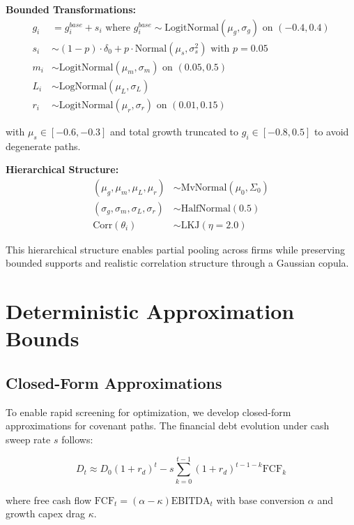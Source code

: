 \documentclass[11pt,a4paper]{article}
\begin{document}
\textbf{Bounded Transformations:}
\begin{align}
g_i &= g^{base}_i + s_i \text{ where } g^{base}_i \sim \text{LogitNormal}(\mu_g, \sigma_g) \text{ on } (-0.4, 0.4) \\
s_i &\sim (1-p) \cdot \delta_0 + p \cdot \text{Normal}(\mu_s, \sigma_s^2) \text{ with } p = 0.05 \\
m_i &\sim \text{LogitNormal}(\mu_m, \sigma_m) \text{ on } (0.05, 0.5) \\
L_i &\sim \text{LogNormal}(\mu_L, \sigma_L) \\
r_i &\sim \text{LogitNormal}(\mu_r, \sigma_r) \text{ on } (0.01, 0.15)
\end{align}

with $\mu_s \in [-0.6, -0.3]$ and total growth truncated to $g_i \in [-0.8, 0.5]$ to avoid degenerate paths.

\textbf{Hierarchical Structure:}
\begin{align}
(\mu_g, \mu_m, \mu_L, \mu_r) &\sim \text{MvNormal}(\mu_0, \Sigma_0) \\
(\sigma_g, \sigma_m, \sigma_L, \sigma_r) &\sim \text{HalfNormal}(0.5) \\
\text{Corr}(\theta_i) &\sim \text{LKJ}(\eta = 2.0)
\end{align}

This hierarchical structure enables partial pooling across firms while preserving bounded supports and realistic correlation structure through a Gaussian copula.

\section{Deterministic Approximation Bounds}

\subsection{Closed-Form Approximations}

To enable rapid screening for optimization, we develop closed-form approximations for covenant paths. The financial debt evolution under cash sweep rate $s$ follows:

\begin{equation}
D_t \approx D_0(1+r_d)^t - s \sum_{k=0}^{t-1} (1+r_d)^{t-1-k} \text{FCF}_k
\end{equation}

where free cash flow $\text{FCF}_t = (\alpha - \kappa) \text{EBITDA}_t$ with base conversion $\alpha$ and growth capex drag $\kappa$.
\end{document}
